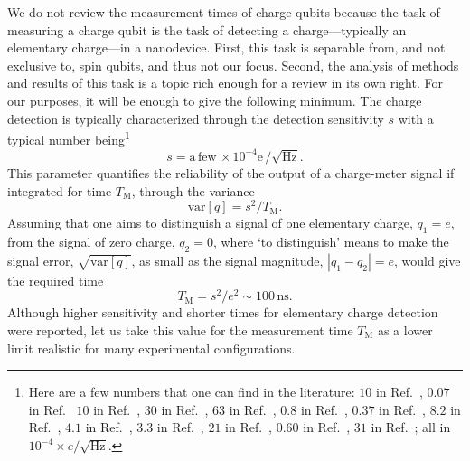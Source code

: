 \documentclass[aps, prx, showpacs, twocolumn, superscriptaddress, notitlepage, longbibliography, floatfix, nofootinbib]{revtex4-2}
\begin{document}
We do not review the measurement times of charge qubits because the task of measuring a charge qubit is the task of detecting a charge---typically an elementary charge---in a nanodevice. First, this task is separable from, and not exclusive to, spin qubits, and thus not our focus. Second, the analysis of methods and results of this task is a topic rich enough for a review in its own right.\cite{gustavsson_electron_2009,clerk_introduction_2010,vigneau_probing_2022} For our purposes, it will be enough to give the following minimum. The charge detection is typically characterized through the detection sensitivity $s$ with a typical number being\footnote
{
Here are a few numbers that one can find in the literature: 
$10$ in Ref.~\cite{reilly_fast_2007},
$0.07$ in Ref.~\cite{angus_silicon_2008} %
$10$ in Ref.~\cite{wang_graphene_2010},
$30$ in Ref.~\cite{fringes_charge_2011}, 
$63$ in Ref.~\cite{colless_dispersive_2013},
$0.8$ in Ref.~\cite{stehlik_fast_2015},
$0.37$ in Ref.~\cite{gonzalez-zalba_probing_2015},
$8.2$ in Ref.~\cite{zajac_scalable_2016},
$4.1$ in Ref.~\cite{zheng_rapid_2019},
$3.3$ in Ref.~\cite{curry_single-shot_2019},
$21$ in Ref.~\cite{chanrion_charge_2020},
$0.60$ in Ref.~\cite{schupp_sensitive_2020},
$31$ in Ref.~\cite{park_single-shot_2024};
all in $10^{-4} \times e/\surd{\mathrm{Hz}}$.

} 
\begin{equation}
s = \mathrm{a\,few}\, \times 10^{-4}\mathrm{e}\, / \sqrt{\mathrm{Hz}}.  
\label{eq:chargeSensitivity}
\end{equation}
This parameter quantifies the reliability of the output of a charge-meter signal if integrated for time $T_\mathrm{M}$, through the variance
\begin{equation}
\textrm{var}[q] = s^2 / T_\mathrm{M}.
\end{equation}
Assuming that one aims to distinguish a signal of one elementary charge, $q_1=e$, from the signal of zero charge, $q_2=0$, where `to distinguish' means to make the signal error, $\sqrt{\textrm{var}[q]}$, as small as the signal magnitude, $|q_1-q_2|=e$, would give the required time
\begin{equation}
T_\mathrm{M} = s^2 / e^2 \sim 100\, \mathrm{ns}.
\label{eq:detectionLimit}
\end{equation}
Although higher sensitivity\cite{schaal_fast_2020} and shorter times\cite{keith_single-shot_2019} for elementary charge detection were reported, let us take this value for the measurement time $T_\mathrm{M}$ as a lower limit 
realistic for many experimental configurations. 
\end{document}
